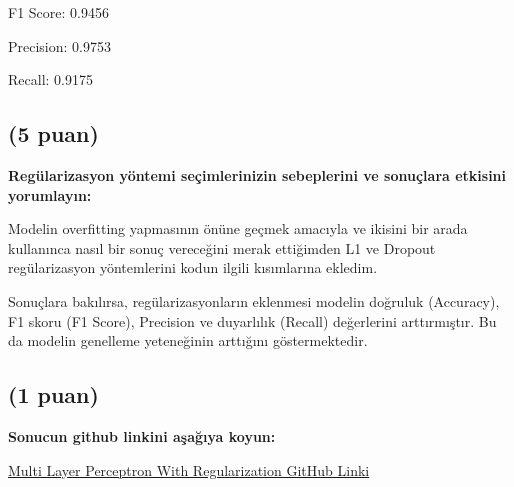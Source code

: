 \documentclass[11pt]{article}
\begin{document}
F1 Score: 0.9456

Precision: 0.9753

Recall: 0.9175

\subsection{(5 puan)} \textbf{Regülarizasyon yöntemi seçimlerinizin sebeplerini ve sonuçlara etkisini yorumlayın:}

Modelin overfitting yapmasının önüne geçmek amacıyla ve ikisini bir arada kullanınca nasıl bir sonuç vereceğini merak ettiğimden L1 ve Dropout regülarizasyon yöntemlerini kodun ilgili kısımlarına ekledim.

Sonuçlara bakılırsa, regülarizasyonların eklenmesi modelin doğruluk (Accuracy), F1 skoru (F1 Score), Precision ve duyarlılık (Recall) değerlerini arttırmıştır. Bu da modelin genelleme yeteneğinin arttığını göstermektedir.

\subsection{(1 puan)} \textbf{Sonucun github linkini  aşağıya koyun:}

\href{https://github.com/ilkay-bicici/yapaysiniraglariornekler/blob/83e7c9b6202ea32adf1ece1eeadc6e4ed62ac409/curetheprincesswithregularization.ipynb}{Multi Layer Perceptron With Regularization GitHub Linki}
\end{document}
